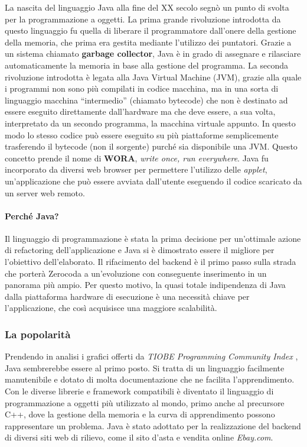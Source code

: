 La nascita del linguaggio Java alla fine del XX secolo segnò un punto di svolta per la programmazione a oggetti. La prima grande rivoluzione introdotta da questo linguaggio fu quella di liberare il programmatore dall'onere della gestione della memoria, che prima era gestita mediante l'utilizzo dei puntatori. Grazie a un sistema chiamato \textbf{garbage collector}, Java è in grado di assegnare e rilasciare automaticamente la memoria in base alla gestione del programma. La seconda rivoluzione introdotta è legata alla Java Virtual Machine (JVM), grazie alla quale i programmi non sono più compilati in codice macchina, ma in una sorta di linguaggio macchina “intermedio” (chiamato bytecode) che non è destinato ad essere eseguito direttamente dall’hardware ma che deve essere, a sua volta, interpretato da un secondo programma, la macchina virtuale appunto. In questo modo lo stesso codice può essere eseguito su più piattaforme semplicemente trasferendo il bytecode (non il sorgente) purché sia disponibile una JVM. Questo concetto prende il nome di \textbf{WORA}, \textit{write once, run everywhere}. Java fu incorporato da diversi web browser per permettere l'utilizzo delle \textit{applet}, un'applicazione che può essere avviata dall'utente eseguendo il codice scaricato da un server web remoto. 

\paragraph*{Perché Java?} Il linguaggio di programmazione è stata la prima decisione per un'ottimale azione di refactoring dell'applicazione e Java si è dimostrato essere il migliore per l'obiettivo dell'elaborato. Il rifacimento del backend è il primo passo sulla strada che porterà Zerocoda a un'evoluzione con conseguente inserimento in un panorama più ampio. Per questo motivo, la quasi totale indipendenza di Java dalla piattaforma hardware di esecuzione è una necessità chiave per l'applicazione, che così acquisisce una maggiore scalabilità. 

\subsubsection{La popolarità}
Prendendo in analisi i grafici offerti da \emph{TIOBE Programming Community Index} \cite{jansen:tiobe}, Java sembrerebbe essere al primo posto. Si tratta di un linguaggio facilmente manutenibile e dotato di molta documentazione che ne facilita l'apprendimento. Con le diverse librerie e framework compatibili è diventato il linguaggio di programmazione a oggetti più utilizzato al mondo, primo anche al precursore C++, dove la gestione della memoria e la curva di apprendimento possono rappresentare un problema. Java è stato adottato per la realizzazione del backend di diversi siti web di rilievo, come il sito d'asta e vendita online \textit{Ebay.com}.

